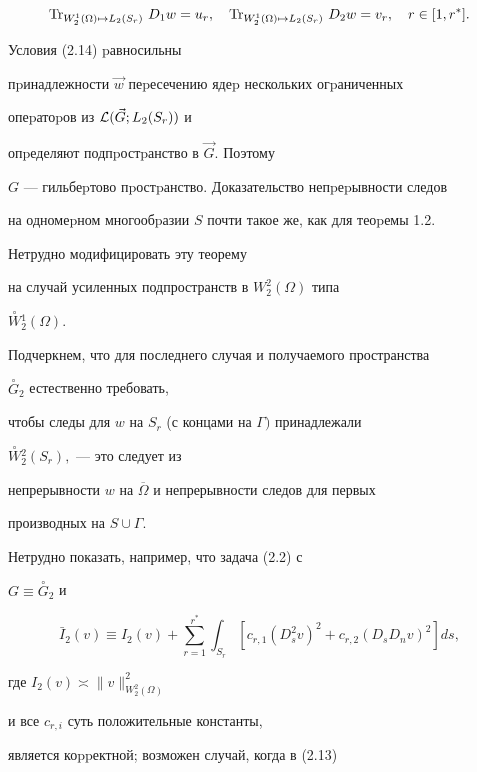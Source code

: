 \begin{pf}
\begin{equation}
\Tr_{ W_2^1 (\Omega)\mapsto L_2(S_r)}\,D_1w=u_r,\quad


\Tr_{ W_2^1 (\Omega)\mapsto L_2(S_r)}\,D_2w=v_r,\quad r\in[1,r^*].


\end{equation}


Условия (2.14) pавносильны


пpинадлежности $\Vec w$ пеpесе\-чению ядеp нескольких огpаниченных


опеpатоpов из ${\cal L}(\Vec G;L_2(S_r))$ и


опpеделяют подпpостpанство в $\Vec G.$ Поэтому


$G$ --- гильбеpто\-во пpостpанство. Доказательство непpеpывности следов


на одномеp\-ном многообpазии $S$ почти такое же, как для теоpемы 1.2.


\end{pf}





Нетрудно модифицировать эту теорему


 на случай усиленных подпространств в $W_2^2 (\Omega)$ типа


$\overset{\circ}W{}^1_2(\Omega).$


Подчеркнем, что для последнего случая и получаемого пространства


$\overset{\circ}G{}_2$ естественно требовать,


чтобы следы для $w$ на $S_r$ (с концами на $\Gamma)$ принадлежа\-ли


$\overset{\circ}W{}^2_2(S_r),$ --- это следует из


 непрерывности $w$ на $\overline\Omega$ и непрерывно\-сти следов для первых


 производных на $S\cup \Gamma$.





 Нетрудно показать, например, что задача (2.2) с


 $G\equiv \overset{\circ}G{}_2$ и


$$


\bar I_2(v)\equiv I_2(v) +\sum_{r=1}^{r^*}


\int_{S_r}[c_{r,1}(D_s^2v)^2+c_{r,2}(D_sD_nv)^2]ds,


$$


где $I_2(v) \asymp\|v\|^2_{W_2^2(\Omega)}$


 и все $c_{r,i}$ суть положительные константы,


 является коppектной; возможен случай, когда в (2.13)


